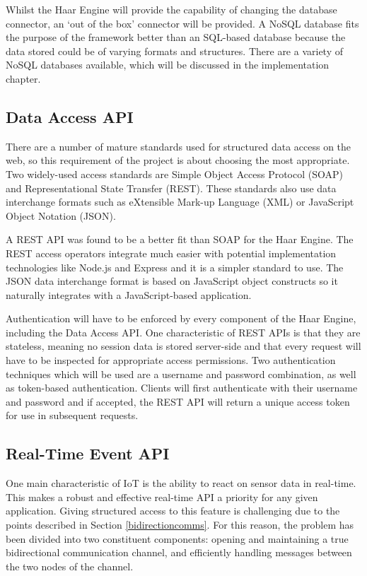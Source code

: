       Whilst the Haar Engine will provide the capability of changing the database connector, an `out of the box' connector will be provided. A NoSQL database fits the purpose of the framework better than an SQL-based database because the data stored could be of varying formats and structures. There are a variety of NoSQL databases available, which will be discussed in the implementation chapter.

    \subsection{Data Access API}
      There are a number of mature standards used for structured data access on the web, so this requirement of the project is about choosing the most appropriate. Two widely-used access standards are Simple Object Access Protocol (SOAP) and Representational State Transfer (REST). These standards also use data interchange formats such as eXtensible Mark-up Language (XML) or JavaScript Object Notation (JSON).

      A REST API was found to be a better fit than SOAP for the Haar Engine. The REST access operators integrate much easier with potential implementation technologies like Node.js and Express and it is a simpler standard to use. The JSON data interchange format is based on JavaScript object constructs so it naturally integrates with a JavaScript-based application.

      Authentication will have to be enforced by every component of the Haar Engine, including the Data Access API. One characteristic of REST APIs is that they are stateless, meaning no session data is stored server-side and that every request will have to be inspected for appropriate access permissions. Two authentication techniques which will be used are a username and password combination, as well as token-based authentication. Clients will first authenticate with their username and password and if accepted, the REST API will return a unique access token for use in subsequent requests.

    \subsection{Real-Time Event API}
      One main characteristic of IoT is the ability to react on sensor data in real-time. This makes a robust and effective real-time API a priority for any given application. Giving structured access to this feature is challenging due to the points described in Section \ref{bidirectioncomms}. For this reason, the problem has been divided into two constituent components: opening and maintaining a true bidirectional communication channel, and efficiently handling messages between the two nodes of the channel.

